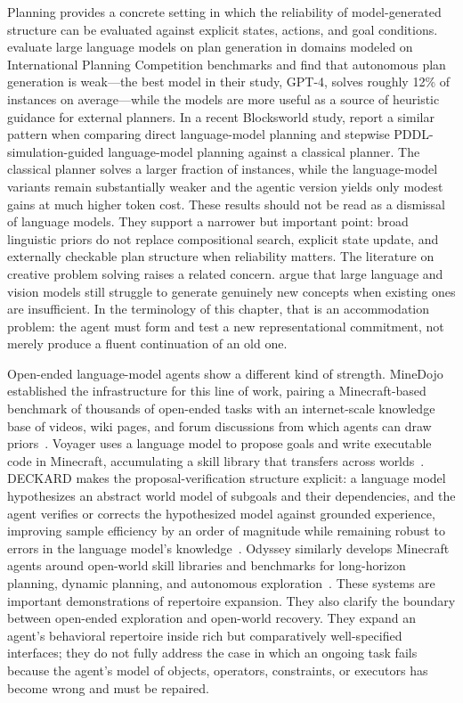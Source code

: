 Planning provides a concrete setting in which the reliability of model-generated structure can be evaluated against explicit states, actions, and goal conditions.
\citet{valmeekam2023planning} evaluate large language models on plan generation in domains modeled on International Planning Competition benchmarks and find that autonomous plan generation is weak---the best model in their study, GPT-4, solves roughly 12\% of instances on average---while the models are more useful as a source of heuristic guidance for external planners.
In a recent Blocksworld study, \citet{gobel2026agentic} report a similar pattern when comparing direct language-model planning and stepwise PDDL-simulation-guided language-model planning against a classical planner.
The classical planner solves a larger fraction of instances, while the language-model variants remain substantially weaker and the agentic version yields only modest gains at much higher token cost.
These results should not be read as a dismissal of language models.
They support a narrower but important point: broad linguistic priors do not replace compositional search, explicit state update, and externally checkable plan structure when reliability matters.
The literature on creative problem solving raises a related concern.
\citet{nair2024cps} argue that large language and vision models still struggle to generate genuinely new concepts when existing ones are insufficient.
In the terminology of this chapter, that is an accommodation problem: the agent must form and test a new representational commitment, not merely produce a fluent continuation of an old one.

Open-ended language-model agents show a different kind of strength.
MineDojo established the infrastructure for this line of work, pairing a Minecraft-based benchmark of thousands of open-ended tasks with an internet-scale knowledge base of videos, wiki pages, and forum discussions from which agents can draw priors~\citep{fan2022minedojo}.
Voyager uses a language model to propose goals and write executable code in Minecraft, accumulating a skill library that transfers across worlds~\citep{wang2023voyager}.
DECKARD makes the proposal-verification structure explicit: a language model hypothesizes an abstract world model of subgoals and their dependencies, and the agent verifies or corrects the hypothesized model against grounded experience, improving sample efficiency by an order of magnitude while remaining robust to errors in the language model's knowledge~\citep{nottingham2023deckard}.
Odyssey similarly develops Minecraft agents around open-world skill libraries and benchmarks for long-horizon planning, dynamic planning, and autonomous exploration~\citep{liu2025odyssey}.
These systems are important demonstrations of repertoire expansion.
They also clarify the boundary between open-ended exploration and open-world recovery.
They expand an agent's behavioral repertoire inside rich but comparatively well-specified interfaces; they do not fully address the case in which an ongoing task fails because the agent's model of objects, operators, constraints, or executors has become wrong and must be repaired.

